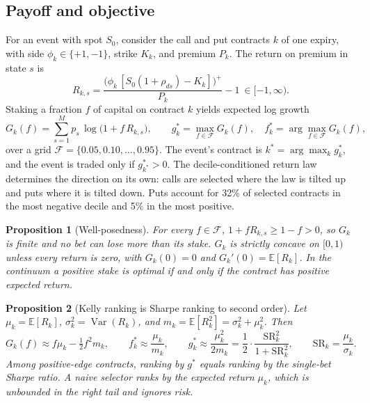 \documentclass[11pt]{article}
\newtheorem{proposition}{Proposition}
\theoremstyle{definition}
\newcommand{\E}{\mathbb{E}}
\newcommand{\Var}{\operatorname{Var}}
\newcommand{\1}{\mathbf{1}}
\newcommand{\F}{\mathcal{F}}
\begin{document}
\subsection{Payoff and objective}

For an event with spot $S_0$, consider the call and put contracts $k$ of one expiry, with side
$\phi_k\in\{+1,-1\}$, strike $K_k$, and premium $P_k$. The return on premium in state $s$ is
\begin{equation}
  R_{k,s}=\frac{\big(\phi_k\,[S_0(1+\rho_{ds})-K_k]\big)^+}{P_k}-1\ \in[-1,\infty).
  \label{eq:payoff}
\end{equation}
Staking a fraction $f$ of capital on contract $k$ yields expected log growth
\begin{equation}
  G_k(f)=\sum_{s=1}^{M}p_s\,\log\big(1+f\,R_{k,s}\big),\qquad
  g^\ast_k=\max_{f\in\F}G_k(f),\quad f^\ast_k=\arg\max_{f\in\F}G_k(f),
  \label{eq:growth}
\end{equation}
over a grid $\F=\{0.05,0.10,\dots,0.95\}$. The event's contract is $k^\ast=\arg\max_k g^\ast_k$,
and the event is traded only if $g^\ast_{k^\ast}>0$. The decile-conditioned return law
determines the direction on its own: calls are selected where the law is tilted up and puts
where it is tilted down. Puts account for 32\% of selected contracts in the most negative
decile and 5\% in the most positive.

\begin{proposition}[Well-posedness]\label{prop:wellposed}
For every $f\in\F$, $1+fR_{k,s}\ge 1-f>0$, so $G_k$ is finite and no bet can lose more than its
stake. $G_k$ is strictly concave on $[0,1)$ unless every return is zero, with $G_k(0)=0$ and
$G_k'(0)=\E[R_k]$. In the continuum a positive stake is optimal if and only if the contract
has positive expected return.
\end{proposition}

\begin{proposition}[Kelly ranking is Sharpe ranking to second order]\label{prop:sharpe}
Let $\mu_k=\E[R_k]$, $\sigma_k^2=\Var(R_k)$, and $m_k=\E[R_k^2]=\sigma_k^2+\mu_k^2$. Then
\begin{equation}
  G_k(f)\approx f\mu_k-\tfrac12 f^2 m_k,\qquad
  f^\ast_k\approx\frac{\mu_k}{m_k},\qquad
  g^\ast_k\approx\frac{\mu_k^2}{2m_k}=\frac12\cdot\frac{\mathrm{SR}_k^2}{1+\mathrm{SR}_k^2},
  \qquad \mathrm{SR}_k=\frac{\mu_k}{\sigma_k}.
\end{equation}
Among positive-edge contracts, ranking by $g^\ast$ equals ranking by the single-bet Sharpe
ratio. A naive selector ranks by the expected return $\mu_k$, which is unbounded in the right
tail and ignores risk.
\end{proposition}
\end{document}
